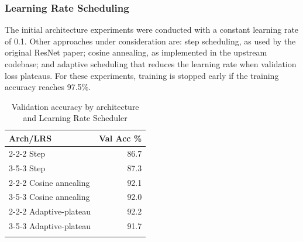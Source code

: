 \documentclass[letterpaper]{article} %
\begin{document}
\subsubsection{Learning Rate Scheduling}

The initial architecture experiments were conducted with a constant learning rate of 0.1.
Other approaches under consideration are: step scheduling, as used by the original ResNet paper;
cosine annealing, as implemented in the upstream codebase; and adaptive scheduling that reduces the learning rate
when validation loss plateaus.
For these experiments, training is stopped early if the training accuracy reaches 97.5\%.

\begin{table}[b]
\centering
\begin{tabular}{|l|r|}
    \firsthline
    Arch/LRS & Val Acc \%    \\
    \hline
    2-2-2 Step & 86.7    \\
    3-5-3 Step & 87.3    \\
    2-2-2 Cosine annealing & 92.1    \\
    3-5-3 Cosine annealing & 92.0    \\
    2-2-2 Adaptive-plateau & 92.2    \\
    3-5-3 Adaptive-plateau & 91.7    \\
    \lasthline
\end{tabular}
\caption{Validation accuracy by architecture and Learning Rate Scheduler}
\label{table2}
\end{table}
\end{document}
